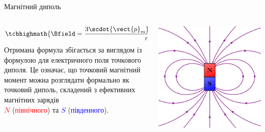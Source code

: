 \documentclass{beamer}
\begin{document}
\begin{frame}{Магнітний диполь}{}
	\begin{block}{}
		\begin{columns}
			\begin{column}{0.7\linewidth}
				\begin{block}{}\justifying
					\begin{equation*}
						\tcbhighmath{\Bfield = \frac{3\scdot{\vect{p}_m}{\vect{r}}\vect{r}}{r^5} - \frac{\vect{p}_m}{r^3}.}
					\end{equation*}
					{\scriptsize Отримана формула збігається за виглядом із формулою для електричного поля точкового диполя. Це означає, що точковий
					магнітний момент можна розглядати формально як точковий диполь, складений з ефективних магнітних зарядів\\ \textcolor{red}{$N$}
					(\textcolor{red}{північного}) та \textcolor{blue}{$S$} (\textcolor{blue}{південного}).}
				\end{block}
			\end{column}
			\begin{column}{0.3\linewidth}
				\includegraphics[width=\linewidth]{magdipole}
			\end{column}
		\end{columns}


\end{block}
\end{frame}
\end{document}
